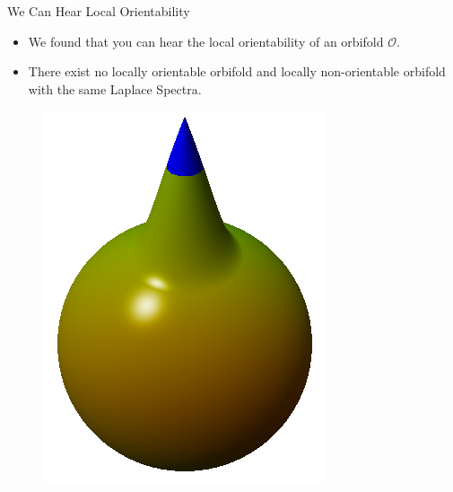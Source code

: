 \documentclass[12pt]{beamer}
\begin{document}
\begin{frame}{We Can Hear Local Orientability}
    \begin{itemize}
        \item We found that you can hear the local orientability of an
            orbifold $\mathcal{O}$. 
        \item There exist no locally orientable orbifold and locally
            non-orientable orbifold with the same Laplace Spectra.
    \end{itemize}
    \begin{figure}
        \begin{columns}[c]
            \begin{column}[c]{0.28\textwidth}
                \includegraphics[width=\textwidth]{images/teardrop.png}
            \end{column}
            \begin{column}[c]{0.28\textwidth}

\end{column}
\end{columns}
\end{figure}
\end{frame}
\end{document}
